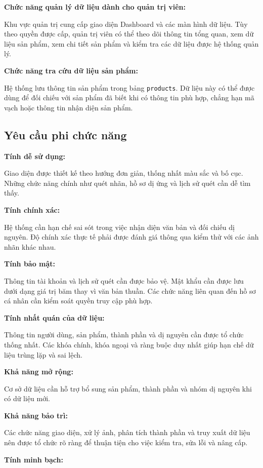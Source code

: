 \textbf{Chức năng quản lý dữ liệu dành cho quản trị viên:}

Khu vực quản trị cung cấp giao diện Dashboard và các màn hình dữ liệu. Tùy theo quyền được cấp, quản trị viên có thể theo dõi thông tin tổng quan, xem dữ liệu sản phẩm, xem chi tiết sản phẩm và kiểm tra các dữ liệu được hệ thống quản lý.

\textbf{Chức năng tra cứu dữ liệu sản phẩm:}

Hệ thống lưu thông tin sản phẩm trong bảng \texttt{products}. Dữ liệu này có thể được dùng để đối chiếu với sản phẩm đã biết khi có thông tin phù hợp, chẳng hạn mã vạch hoặc thông tin nhận diện sản phẩm.

\subsection{Yêu cầu phi chức năng}

\textbf{Tính dễ sử dụng:}

Giao diện được thiết kế theo hướng đơn giản, thống nhất màu sắc và bố cục. Những chức năng chính như quét nhãn, hồ sơ dị ứng và lịch sử quét cần dễ tìm thấy.

\textbf{Tính chính xác:}

Hệ thống cần hạn chế sai sót trong việc nhận diện văn bản và đối chiếu dị nguyên. Độ chính xác thực tế phải được đánh giá thông qua kiểm thử với các ảnh nhãn khác nhau.

\textbf{Tính bảo mật:}

Thông tin tài khoản và lịch sử quét cần được bảo vệ. Mật khẩu cần được lưu dưới dạng giá trị băm thay vì văn bản thuần. Các chức năng liên quan đến hồ sơ cá nhân cần kiểm soát quyền truy cập phù hợp.

\textbf{Tính nhất quán của dữ liệu:}

Thông tin người dùng, sản phẩm, thành phần và dị nguyên cần được tổ chức thống nhất. Các khóa chính, khóa ngoại và ràng buộc duy nhất giúp hạn chế dữ liệu trùng lặp và sai lệch.

\textbf{Khả năng mở rộng:}

Cơ sở dữ liệu cần hỗ trợ bổ sung sản phẩm, thành phần và nhóm dị nguyên khi có dữ liệu mới.

\textbf{Khả năng bảo trì:}

Các chức năng giao diện, xử lý ảnh, phân tích thành phần và truy xuất dữ liệu nên được tổ chức rõ ràng để thuận tiện cho việc kiểm tra, sửa lỗi và nâng cấp.

\textbf{Tính minh bạch:}

